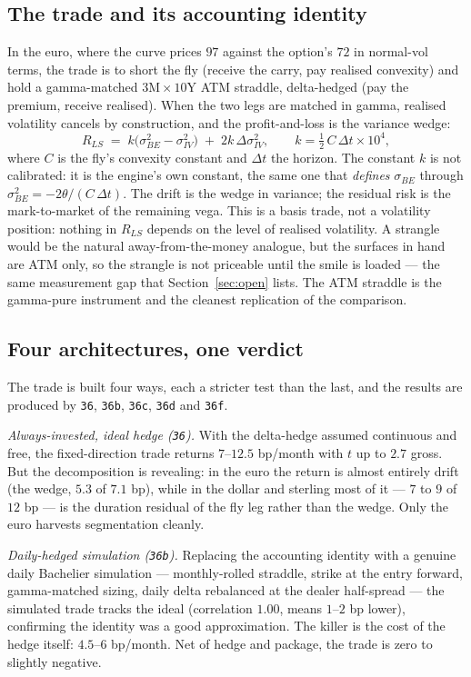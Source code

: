 \documentclass[11pt]{article}
\begin{document}
\subsection{The trade and its accounting identity}\label{sec:strat-identity}
In the euro, where the curve prices $97$ against the option's $72$ in normal-vol terms, the trade is
to short the fly (receive the carry, pay realised convexity) and hold a gamma-matched
$3\mathrm{M}\times10\mathrm{Y}$ ATM straddle, delta-hedged (pay the premium, receive realised). When
the two legs are matched in gamma, realised volatility cancels by construction, and the profit-and-loss
is the variance wedge:
\[
R_{LS} \;=\; k\big(\sigma_{BE}^2-\sigma_{IV}^2\big)\;+\;2k\,\Delta\sigma_{IV}^2,
\qquad k=\tfrac12\,C\,\Delta t\times10^4,
\]
where $C$ is the fly's convexity constant and $\Delta t$ the horizon. The constant $k$ is not
calibrated: it is the engine's own constant, the same one that \emph{defines} $\sigma_{BE}$ through
$\sigma_{BE}^2=-2\theta/(C\,\Delta t)$. The drift is the wedge in variance; the residual risk is the
mark-to-market of the remaining vega. This is a basis trade, not a volatility position: nothing in
$R_{LS}$ depends on the level of realised volatility. A strangle would be the natural
away-from-the-money analogue, but the surfaces in hand are ATM only, so the strangle is not priceable
until the smile is loaded --- the same measurement gap that Section~\ref{sec:open} lists. The ATM
straddle is the gamma-pure instrument and the cleanest replication of the comparison.

\subsection{Four architectures, one verdict}\label{sec:strat-four}
The trade is built four ways, each a stricter test than the last, and the results are produced by
\texttt{36}, \texttt{36b}, \texttt{36c}, \texttt{36d} and \texttt{36f}.

\emph{Always-invested, ideal hedge (\texttt{36}).} With the delta-hedge assumed continuous and free,
the fixed-direction trade returns $7$--$12.5$ bp/month with $t$ up to $2.7$ gross. But the
decomposition is revealing: in the euro the return is almost entirely drift (the wedge, $5.3$ of
$7.1$ bp), while in the dollar and sterling most of it --- $7$ to $9$ of $12$ bp --- is the duration
residual of the fly leg rather than the wedge. Only the euro harvests segmentation cleanly.

\emph{Daily-hedged simulation (\texttt{36b}).} Replacing the accounting identity with a genuine daily
Bachelier simulation --- monthly-rolled straddle, strike at the entry forward, gamma-matched sizing,
daily delta rebalanced at the dealer half-spread --- the simulated trade tracks the ideal
(correlation $1.00$, means $1$--$2$ bp lower), confirming the identity was a good approximation. The
killer is the cost of the hedge itself: $4.5$--$6$ bp/month. Net of hedge and package, the trade is
zero to slightly negative.
\end{document}
